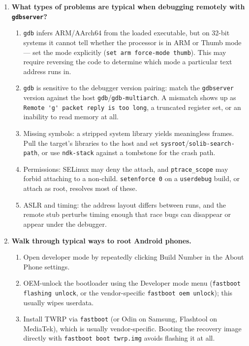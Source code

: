 \documentclass[12pt]{Training}
\begin{document}
\begin{enumerate}
\begin{enumerate}
        \item For an application rather than a daemon, a debuggable build and \lstinline{run-as <package>} avoid the root requirement entirely.
    \end{enumerate}
    \item \textbf{What types of problems are typical when debugging remotely with \lstinline{gdbserver}?}
    \begin{enumerate}
        \item \lstinline{gdb} infers ARM/AArch64 from the loaded executable, but on 32-bit systems it cannot tell whether the processor is in ARM or Thumb mode --- set the mode explicitly (\lstinline{set arm force-mode thumb}). This may require reversing the code to determine which mode a particular text address runs in.
        \item \lstinline{gdb} is sensitive to the debugger version pairing: match the \lstinline{gdbserver} version against the host \lstinline{gdb}/\lstinline{gdb-multiarch}. A mismatch shows up as \lstinline{Remote 'g' packet reply is too long}, a truncated register set, or an inability to read memory at all.
        \item Missing symbols: a stripped system library yields meaningless frames. Pull the target's libraries to the host and set \lstinline{sysroot}/\lstinline{solib-search-path}, or use \lstinline{ndk-stack} against a tombstone for the crash path.
        \item Permissions: SELinux may deny the attach, and \lstinline{ptrace_scope} may forbid attaching to a non-child. \lstinline{setenforce 0} on a \lstinline{userdebug} build, or attach as root, resolves most of these.
        \item ASLR and timing: the address layout differs between runs, and the remote stub perturbs timing enough that race bugs can disappear or appear under the debugger.
    \end{enumerate}
    \item \textbf{Walk through typical ways to root Android phones.}
    \begin{enumerate}
        \item Open developer mode by repeatedly clicking Build Number in the About Phone settings.
        \item OEM-unlock the bootloader using the Developer mode menu (\lstinline{fastboot flashing unlock}, or the vendor-specific \lstinline{fastboot oem unlock}); this usually wipes userdata.
        \item Install TWRP via \lstinline{fastboot} (or Odin on Samsung, Flashtool on MediaTek), which is usually vendor-specific. Booting the recovery image directly with \lstinline{fastboot boot twrp.img} avoids flashing it at all.

\end{enumerate}
\end{enumerate}
\end{document}
